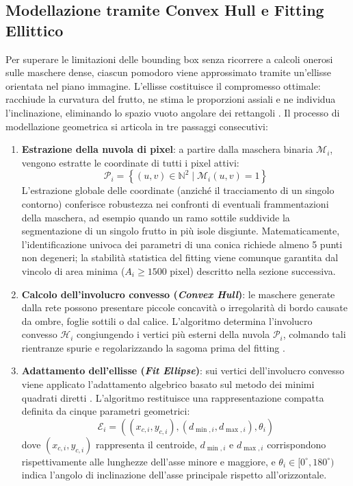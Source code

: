 \subsection{Modellazione tramite Convex Hull e Fitting Ellittico}
\label{subsec:modellazione_ellittica}

Per superare le limitazioni delle bounding box senza ricorrere a calcoli onerosi sulle maschere dense, ciascun pomodoro viene approssimato tramite un'ellisse orientata nel piano immagine. L'ellisse costituisce il compromesso ottimale: racchiude la curvatura del frutto, ne stima le proporzioni assiali e ne individua l'inclinazione, eliminando lo spazio vuoto angolare dei rettangoli \cite{wang2024multifruit}.
Il processo di modellazione geometrica si articola in tre passaggi consecutivi:
\begin{enumerate}
    \item \textbf{Estrazione della nuvola di pixel}: a partire dalla maschera binaria $\mathcal{M}_i$, vengono estratte le coordinate di tutti i pixel attivi:
    \begin{equation}
        \mathcal{P}_i = \left\{ (u, v) \in \mathbb{N}^2 \mid \mathcal{M}_i(u, v) = 1 \right\}
    \end{equation}
    L'estrazione globale delle coordinate (anziché il tracciamento di un singolo contorno) conferisce robustezza nei confronti di eventuali frammentazioni della maschera, ad esempio quando un ramo sottile suddivide la segmentazione di un singolo frutto in più isole disgiunte. Matematicamente, l'identificazione univoca dei parametri di una conica richiede almeno 5 punti non degeneri; la stabilità statistica del fitting viene comunque garantita dal vincolo di area minima ($A_i \ge 1500$ pixel) descritto nella sezione successiva.
    
    \item \textbf{Calcolo dell'involucro convesso (\textit{Convex Hull})}: le maschere generate dalla rete possono presentare piccole concavità o irregolarità di bordo causate da ombre, foglie sottili o dal calice. L'algoritmo determina l'involucro convesso $\mathcal{H}_i$ congiungendo i vertici più esterni della nuvola $\mathcal{P}_i$, colmando tali rientranze spurie e regolarizzando la sagoma prima del fitting \cite{changhui2017reconstruction}.
    
    \item \textbf{Adattamento dell'ellisse (\textit{Fit Ellipse})}: sui vertici dell'involucro convesso viene applicato l'adattamento algebrico basato sul metodo dei minimi quadrati diretti \cite{fitzgibbon1999direct}. L'algoritmo restituisce una rappresentazione compatta definita da cinque parametri geometrici:
    \begin{equation}
        \mathcal{E}_i = \left( (x_{c, i}, y_{c, i}), (d_{\min, i}, d_{\max, i}), \theta_i \right)
        \label{eq:parametri_ellisse}
    \end{equation}
    dove $(x_{c, i}, y_{c, i})$ rappresenta il centroide, $d_{\min, i}$ e $d_{\max, i}$ corrispondono rispettivamente alle lunghezze dell'asse minore e maggiore, e $\theta_i \in [0^\circ, 180^\circ)$ indica l'angolo di inclinazione dell'asse principale rispetto all'orizzontale.
\end{enumerate}

